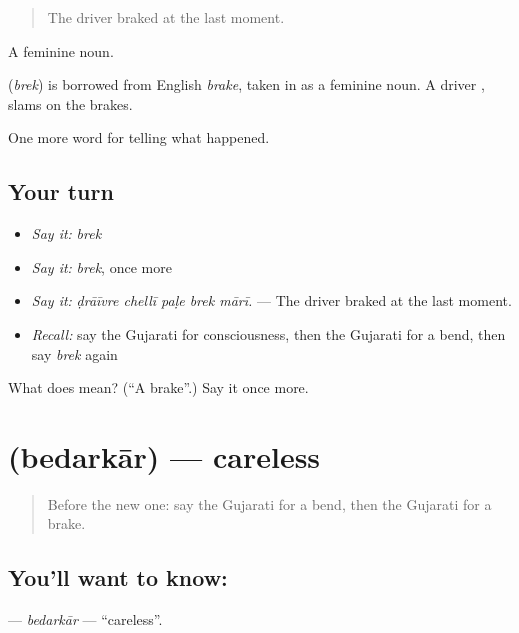 \begin{quote}
The driver braked at the last moment.
\end{quote}

A feminine noun.

\begin{cousinweb}
\textbf{} (\emph{brek}) is borrowed from English \emph{brake}, taken in as a feminine noun. A driver \textbf{  }, slams on the brakes.
\end{cousinweb}

\begin{grammarlens}[title={What you've built}]
One more word for telling what happened.
\end{grammarlens}

\subsection*{Your turn}
\begin{itemize}
\raggedright
  \item \emph{Say it:} \emph{brek}
  \item \emph{Say it:} \emph{brek}, once more
  \item \emph{Say it:} \emph{ḍrāīvre chellī paḷe brek mārī.} — The driver braked at the last moment.
  \item \emph{Recall:} say the Gujarati for consciousness, then the Gujarati for a bend, then say \emph{brek} again
\end{itemize}

\begin{tcolorbox}[breakable,colback=teal!4,colframe=teal!35!black,title={Before you move on}]
What does  mean? (\textquotedblleft{}A brake\textquotedblright{}.) Say it once more.
\end{tcolorbox}
\section[\texorpdfstring{\gu{બેદરકાર} (bedarkār)}{બેદરકાર (bedarkār)}]{ (bedarkār) — careless}

\label{lesson:GU-C295-bedarkar}



\begin{quote}
Before the new one: say the Gujarati for a bend, then the Gujarati for a brake.
\end{quote}

\subsection*{You'll want to know: }
\textbf{} — \emph{bedarkār} — \textquotedblleft{}careless\textquotedblright{}.

